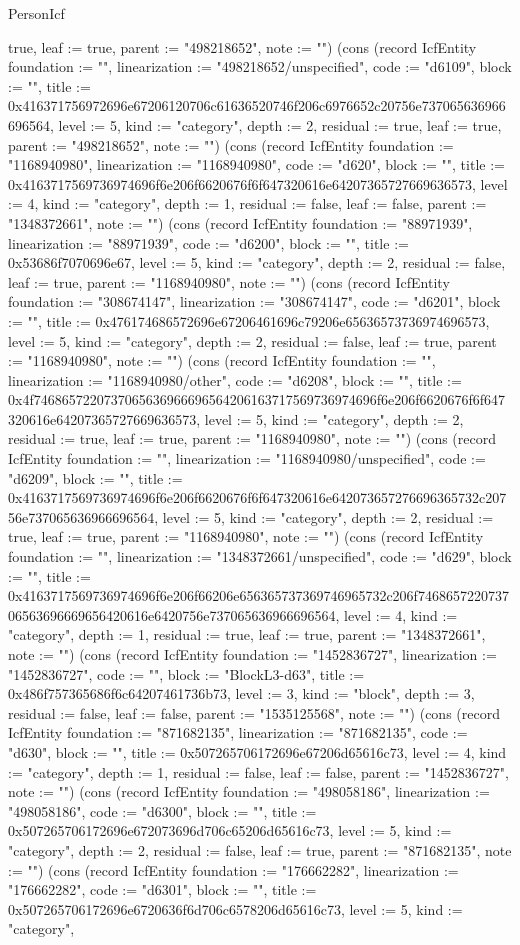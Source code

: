 \begin{lexlean}{PersonIcf}
\begin{semanticmodule}
{true, leaf := true, parent := "498218652", note := ""}) (cons (record IcfEntity {foundation := "", linearization := "498218652/unspecified", code := "d6109", block := "", title := 0x416371756972696e67206120706c61636520746f206c6976652c20756e737065636966696564, level := 5, kind := "category", depth := 2, residual := true, leaf := true, parent := "498218652", note := ""}) (cons (record IcfEntity {foundation := "1168940980", linearization := "1168940980", code := "d620", block := "", title := 0x4163717569736974696f6e206f6620676f6f647320616e64207365727669636573, level := 4, kind := "category", depth := 1, residual := false, leaf := false, parent := "1348372661", note := ""}) (cons (record IcfEntity {foundation := "88971939", linearization := "88971939", code := "d6200", block := "", title := 0x53686f7070696e67, level := 5, kind := "category", depth := 2, residual := false, leaf := true, parent := "1168940980", note := ""}) (cons (record IcfEntity {foundation := "308674147", linearization := "308674147", code := "d6201", block := "", title := 0x476174686572696e67206461696c79206e65636573736974696573, level := 5, kind := "category", depth := 2, residual := false, leaf := true, parent := "1168940980", note := ""}) (cons (record IcfEntity {foundation := "", linearization := "1168940980/other", code := "d6208", block := "", title := 0x4f7468657220737065636966696564206163717569736974696f6e206f6620676f6f647320616e64207365727669636573, level := 5, kind := "category", depth := 2, residual := true, leaf := true, parent := "1168940980", note := ""}) (cons (record IcfEntity {foundation := "", linearization := "1168940980/unspecified", code := "d6209", block := "", title := 0x4163717569736974696f6e206f6620676f6f647320616e642073657276696365732c20756e737065636966696564, level := 5, kind := "category", depth := 2, residual := true, leaf := true, parent := "1168940980", note := ""}) (cons (record IcfEntity {foundation := "", linearization := "1348372661/unspecified", code := "d629", block := "", title := 0x4163717569736974696f6e206f66206e656365737369746965732c206f746865722073706563696669656420616e6420756e737065636966696564, level := 4, kind := "category", depth := 1, residual := true, leaf := true, parent := "1348372661", note := ""}) (cons (record IcfEntity {foundation := "1452836727", linearization := "1452836727", code := "", block := "BlockL3-d63", title := 0x486f757365686f6c64207461736b73, level := 3, kind := "block", depth := 3, residual := false, leaf := false, parent := "1535125568", note := ""}) (cons (record IcfEntity {foundation := "871682135", linearization := "871682135", code := "d630", block := "", title := 0x507265706172696e67206d65616c73, level := 4, kind := "category", depth := 1, residual := false, leaf := false, parent := "1452836727", note := ""}) (cons (record IcfEntity {foundation := "498058186", linearization := "498058186", code := "d6300", block := "", title := 0x507265706172696e672073696d706c65206d65616c73, level := 5, kind := "category", depth := 2, residual := false, leaf := true, parent := "871682135", note := ""}) (cons (record IcfEntity {foundation := "176662282", linearization := "176662282", code := "d6301", block := "", title := 0x507265706172696e6720636f6d706c6578206d65616c73, level := 5, kind := "category", }
\end{semanticmodule}
\end{lexlean}
